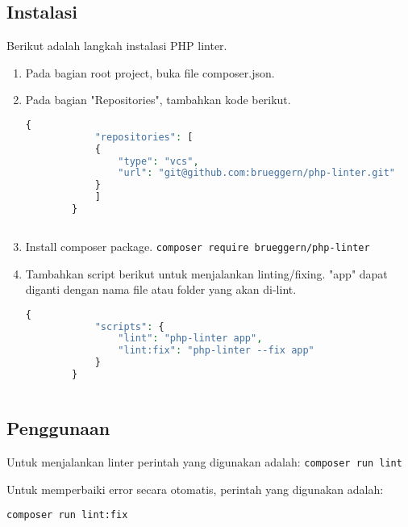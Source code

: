 \subsection{Instalasi}
Berikut adalah langkah instalasi PHP linter.
\begin{enumerate}
	\item Pada bagian root project, buka file composer.json.
	\item Pada bagian "Repositories", tambahkan kode berikut.
	\begin{lstlisting}[language=php, caption=kode kode, label=kode:aneh]
		{
			"repositories": [
			{
				"type": "vcs",
				"url": "git@github.com:brueggern/php-linter.git"
			}
			]
		}
		
	\end{lstlisting}
	
	\item Install composer package.
	\verb|composer require brueggern/php-linter|  
	
	\item Tambahkan script berikut untuk menjalankan linting/fixing. "app" dapat diganti dengan nama file atau folder yang akan di-lint. 
	\begin{lstlisting}[language=php, caption=kode kode, label=kode:aneh]
		{
			"scripts": {
				"lint": "php-linter app",
				"lint:fix": "php-linter --fix app"
			}
		}
		
	\end{lstlisting}
\end{enumerate}


\subsection{Penggunaan}
Untuk menjalankan linter perintah yang digunakan adalah:
	\verb|composer run lint|    

Untuk memperbaiki error secara otomatis, perintah yang digunakan adalah:

	\verb|composer run lint:fix|    

